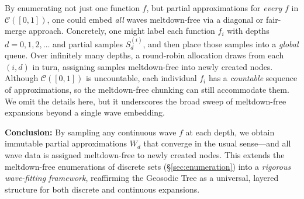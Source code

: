\begin{remark}
  By enumerating not just one function $f$, but partial approximations for
  \emph{every} $f$ in $\mathcal{C}([0,1])$, one could embed \emph{all} waves meltdown-free
  via a diagonal or fair-merge approach. Concretely, one might label each function $f_i$
  with depths $d=0,1,2,\dots$ and partial samples $S_d^{(i)}$, and then place those
  samples into a \emph{global} queue. Over infinitely many depths, a round-robin allocation
  draws from each $(i,d)$ in turn, assigning samples meltdown-free into newly created nodes.
  Although $\mathcal{C}([0,1])$ is uncountable, each individual $f_i$ has a \emph{countable}
  sequence of approximations, so the meltdown-free chunking can still accommodate them.
  We omit the details here, but it underscores the broad sweep of meltdown-free expansions
  beyond a single wave embedding.
\end{remark}

\smallskip

\noindent
\textbf{Conclusion:} By sampling any continuous wave $f$ at each depth, we obtain
immutable partial approximations $W_d$ that converge in the usual sense---and
all wave data is assigned meltdown-free to newly created nodes. This extends
the meltdown-free enumerations of discrete sets (\S\ref{sec:enumeration}) into a
\emph{rigorous wave-fitting framework}, reaffirming the Geosodic Tree as a
universal, layered structure for both discrete and continuous expansions.
